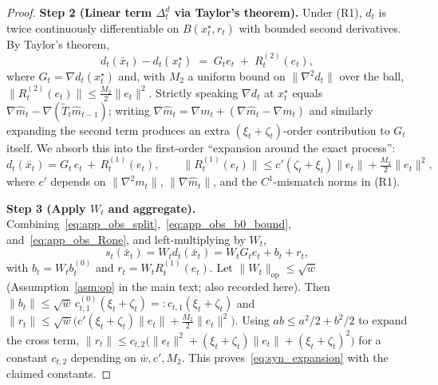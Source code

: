 \documentclass{article}
\theoremstyle{plain}
\theoremstyle{definition}
\theoremstyle{remark}
\begin{document}
\begin{proof}
\textbf{Step 2 (Linear term \(\Delta_t^d\) via Taylor's theorem).}
Under (R1), \(d_t\) is twice continuously differentiable on
\(B(x_t^\star,r_t)\) with bounded second derivatives. By Taylor's theorem,
\begin{equation}
d_t(\bar x_t) - d_t(x_t^\star)
\;=\; G_t e_t \;+\; R_t^{(2)}(e_t),
\label{eq:app_obs_taylor}
\end{equation}
where \(G_t = \nabla d_t(x_t^\star)\) and, with \(M_2\) a uniform bound on
\(\|\nabla^2 d_t\|\) over the ball,
\(\|R_t^{(2)}(e_t)\| \le \tfrac{M_2}{2}\|e_t\|^2\). Strictly speaking
\(\nabla d_t\) at \(x_t^\star\) equals
\(\nabla\hat m_t - \nabla(\tilde T_t \hat m_{t-1})\); writing
\(\nabla\hat m_t = \nabla m_t + (\nabla\hat m_t - \nabla m_t)\) and
similarly expanding the second term produces an extra
\((\xi_t+\zeta_t)\)-order contribution to \(G_t\) itself. We absorb this
into the first-order ``expansion around the exact process'':
\begin{equation}
d_t(\bar x_t) = G_t\, e_t \,+\, R_t^{(1)}(e_t),
\qquad
\|R_t^{(1)}(e_t)\| \le c'(\zeta_t + \xi_t)\|e_t\| + \tfrac{M_2}{2}\|e_t\|^2,
\label{eq:app_obs_Rone}
\end{equation}
where \(c'\) depends on \(\|\nabla^2 m_t\|\), \(\|\nabla \hat m_t\|\),
and the \(C^1\)-mismatch norms in (R1).

\textbf{Step 3 (Apply \(W_t\) and aggregate).}
Combining~\eqref{eq:app_obs_split},~\eqref{eq:app_obs_b0_bound},
and~\eqref{eq:app_obs_Rone}, and left-multiplying by \(W_t\),
\begin{equation}
s_t(\bar x_t) = W_t d_t(\bar x_t) = W_t G_t e_t + b_t + r_t,
\label{eq:app_obs_expansion_final}
\end{equation}
with \(b_t = W_t b_t^{(0)}\) and \(r_t = W_t R_t^{(1)}(e_t)\). Let
\(\|W_t\|_{\mathrm{op}} \le \sqrt{\overline w}\) (Assumption~\ref{asm:op}
in the main text; also recorded here). Then
\(\|b_t\| \le \sqrt{\overline w}\,c_{t,1}^{(0)}(\xi_t+\zeta_t) =:
c_{t,1}(\xi_t+\zeta_t)\) and
\(\|r_t\| \le \sqrt{\overline w}\bigl(c'(\xi_t+\zeta_t)\|e_t\|
+ \tfrac{M_2}{2}\|e_t\|^2\bigr)\). Using \(ab \le a^2/2 + b^2/2\) to expand
the cross term,
\(\|r_t\| \le c_{t,2}\bigl(\|e_t\|^2 + (\xi_t+\zeta_t)\|e_t\| +
(\xi_t+\zeta_t)^2\bigr)\) for a constant \(c_{t,2}\) depending on
\(\overline w, c', M_2\). This proves~\eqref{eq:syn_expansion} with the
claimed constants.


\end{proof}
\end{document}
